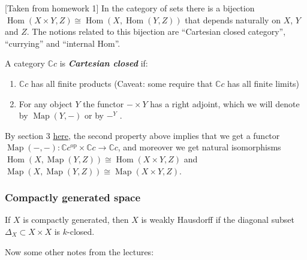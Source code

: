 [Taken from homework 1]
	In the category of sets there is a bijection $\operatorname{Hom}(X\times Y, Z)\cong \operatorname{Hom}(X, \operatorname{Hom}(Y, Z))$ that depends naturally on $X$, $Y$ and $Z$. The notions related to this bijection are “Cartesian closed category”, “currying” and “internal Hom”.
\begin{defn}
	A category $\mathbb{C}c$ is \textbf{\textit{Cartesian closed}} if:
	\begin{enumerate}
		\item $\mathbb{C}c$ has all finite products (Caveat: some require that $\mathbb{C}c$ has all finite limits)
		\item For any object $Y$ the functor $- \times Y$ has a right adjoint, which we will denote by $\operatorname{Map}(Y,-)$ or by $-^Y$ .
	\end{enumerate}
\end{defn}
\begin{remark}
	By section 3 \href{https://ncatlab.org/nlab/show/internal+hom }{here}, the second property above implies that we get a functor $\operatorname{Map}(-,-) : \mathbb{C}c^{\operatorname{op}} \times \mathbb{C}c \to \mathbb{C}c$, and moreover we get natural isomorphisms $\operatorname{Hom}(X, \operatorname{Map}(Y, Z)) \cong \operatorname{Hom}(X \times Y, Z)$ and $\operatorname{Map}(X, \operatorname{Map}(Y, Z))\cong \operatorname{Map}(X \times Y, Z)$.
\end{remark}

\subsubsection{Compactly generated space}

\begin{claim}
		If $X$ is compactly generated, then $X$ is weakly Hausdorff if the diagonal subset $\Delta_X\subset X\times X$ is {\color{orange}$k$-closed}.
\end{claim}
	 Now some other notes from the lectures:
	

